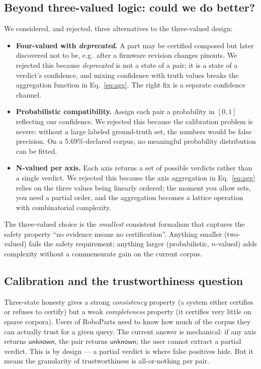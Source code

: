 \subsection{Beyond three-valued logic: could we do better?}

We considered, and rejected, three alternatives to the three-valued
design:

\begin{itemize}[nosep,leftmargin=*]
\item \textbf{Four-valued with \emph{deprecated}.} A part may
be certified composed but later discovered not to be, e.g.\ after
a firmware revision changes pinouts. We rejected this because
\emph{deprecated} is not a state of a pair; it is a state of a
verdict's confidence, and mixing confidence with truth values
breaks the aggregation function in Eq.~\eqref{eq:agg}. The right
fix is a separate confidence channel.

\item \textbf{Probabilistic compatibility.} Assign each pair a
probability in $[0, 1]$ reflecting our confidence. We rejected
this because the calibration problem is severe: without a large
labeled ground-truth set, the numbers would be false precision.
On a 5.69\%-declared corpus, no meaningful probability
distribution can be fitted.

\item \textbf{N-valued per axis.} Each axis returns a set of
possible verdicts rather than a single verdict. We rejected this
because the axis aggregation in Eq.~\eqref{eq:agg} relies on the
three values being linearly ordered; the moment you allow sets,
you need a partial order, and the aggregation becomes a lattice
operation with combinatorial complexity.
\end{itemize}

The three-valued choice is the \emph{smallest} consistent formalism
that captures the safety property ``no evidence means no
certification''. Anything smaller (two-valued) fails the safety
requirement; anything larger (probabilistic, $n$-valued) adds
complexity without a commensurate gain on the current corpus.

\subsection{Calibration and the trustworthiness question}

Three-state honesty gives a strong \emph{consistency} property
(a system either certifies or refuses to certify) but a weak
\emph{completeness} property (it certifies very little on sparse
corpora). Users of RoboParts need to know how much of the corpus
they can actually trust for a given query. The current answer is
mechanical: if any axis returns $\mathsf{unknown}$, the pair
returns $\mathsf{unknown}$; the user cannot extract a partial
verdict. This is by design — a partial verdict is where false
positives hide. But it means the granularity of trustworthiness
is all-or-nothing per pair.

